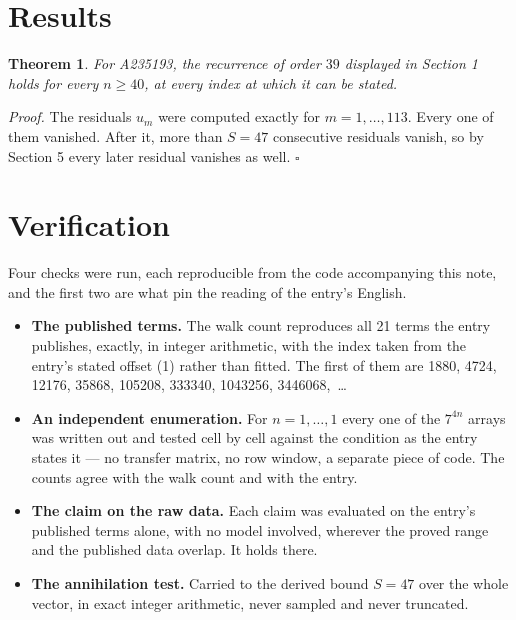 \documentclass[11pt]{article}
\newtheorem{theorem}{Theorem}
\theoremstyle{definition}
\begin{document}
\section{Results}

\begin{theorem} For A235193, the recurrence of order $39$ displayed in Section 1 holds for every $n \ge 40$, at every index at which it can be stated.\end{theorem}

{\itshape Proof.} The residuals $u_m$ were computed exactly for $m = 1,\dots,113$. Every one of them vanished. After it, more than $S = 47$ consecutive residuals vanish, so by Section 5 every later residual vanishes as well. $\square$

\section{Verification}

Four checks were run, each reproducible from the code accompanying this note, and the first two are what pin the reading of the entry's English.

\begin{itemize}

\item {\bfseries The published terms.} The walk count reproduces all 21 terms the entry publishes, exactly, in integer arithmetic, with the index taken from the entry's stated offset (1) rather than fitted. The first of them are 1880, 4724, 12176, 35868, 105208, 333340, 1043256, 3446068,~\dots

\item {\bfseries An independent enumeration.} For $n = 1,\dots,1$ every one of the $7^{4n}$ arrays was written out and tested cell by cell against the condition as the entry states it --- no transfer matrix, no row window, a separate piece of code. The counts agree with the walk count and with the entry.

\item {\bfseries The claim on the raw data.} Each claim was evaluated on the entry's published terms alone, with no model involved, wherever the proved range and the published data overlap. It holds there.

\item {\bfseries The annihilation test.} Carried to the derived bound $S = 47$ over the whole vector, in exact integer arithmetic, never sampled and never truncated.

\end{itemize}
\end{document}
